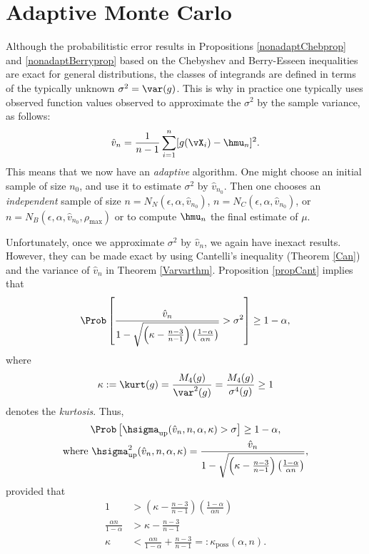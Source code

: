 \documentclass[12pt]{amsart}
\newcommand{\hv}{\hat{v}}
\begin{document}
\section{Adaptive Monte Carlo}
Although the probabilitistic error results in Propositions \ref{nonadaptChebprop} and \ref{nonadaptBerryprop} based on the Chebyshev and Berry-Esseen inequalities are exact for general distributions, the classes of integrands are defined in terms of the typically unknown $\sigma^2=\var(g)$.  This is why in practice one typically uses observed function values observed to approximate the $\sigma^2$ by the sample variance, as follows:
\begin{equation} \label{samplevar}
\hv_{n} = \frac 1{n-1} \sum_{i=1}^{n} [g(\vX_i)- \hmu_{n}]^2.
\end{equation}
This means that we now have an \emph{adaptive} algorithm.  One might choose an initial sample of size $n_0$, and use it to estimate $\sigma^2$ by $\hv_{n_0}$.  Then one chooses an \emph{independent} sample of size $n=N_{N}(\epsilon,\alpha,\hv_{n_0})$, $n=N_{C}(\epsilon,\alpha,\hv_{n_0})$, or  $n=N_{B}(\epsilon,\alpha,\hv_{n_0},\rho_{\max})$ or to compute $\hmu_n$ the final estimate of $\mu$.

Unfortunately, once we approximate $\sigma^2$ by $\hv_n$, we again have inexact results.  However, they can be made exact by using Cantelli's inequality (Theorem \ref{Can}) and the variance of $\hv_n$ in Theorem \ref{Varvarthm}.  Proposition \ref{propCant} implies that
\[
\Prob\left[\frac{\hv_n}{1 - \sqrt{\left ( \kappa  - \frac{n-3}{n-1}\right)\left(\frac{1-\alpha}{\alpha n}\right)}} > \sigma^2 \right] \ge 1 - \alpha,
\]
where 
\begin{equation} \label{kurtdef}
\kappa:= \kurt(g) = \frac{M_4(g)}{\var^2(g)} = \frac{M_4(g)}{\sigma^4(g)} \ge 1
\end{equation}
denotes the \emph{kurtosis}.  Thus,
\begin{subequations}\label{probvarupbd}
\begin{gather} 
\Prob\left[\hsigma_{\text{up}}(\hv_n,n,\alpha,\kappa)  > \sigma \right] \ge 1 - \alpha, \\
\text{where } \hsigma^2_{\text{up}}(\hv_n,n,\alpha,\kappa) = \frac{\hv_{n}}{1 - \sqrt{ \left ( \kappa  - \frac{n-3}{n-1}\right)\left(\frac{1-\alpha}{\alpha n }\right)}},
\end{gather}
\end{subequations}
provided that
\begin{align*}
1 &> \left ( \kappa  - \frac{n-3}{n-1}\right)\left(\frac{1-\alpha}{ \alpha n}\right)\\
\frac{\alpha n }{1-\alpha} & > \kappa  - \frac{n-3}{n-1} \\
\kappa & < \frac{\alpha n}{1-\alpha} + \frac{n-3}{n-1} =: \kappa_{\text{poss}} (\alpha,n).
\end{align*}
\end{document}

